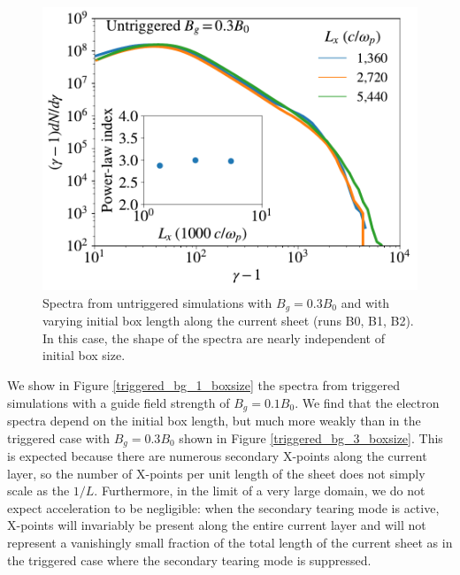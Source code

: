 \begin{figure}[htp] 
	\includegraphics[width=\linewidth]{untriggered_bguide_3_boxsize.pdf}
	\caption{Spectra from untriggered simulations with $B_{g}=0.3B_{0}$ and with varying initial box length along the current sheet (runs B0, B1, B2).  In this case, the shape of the spectra are nearly independent of initial box size.}
	\label{untriggered_bg_3_boxsize}
\end{figure}


We show in Figure \ref{triggered_bg_1_boxsize} the spectra from triggered simulations with a guide field strength of $B_{g}=0.1B_{0}$.  We find that the electron spectra depend on the initial box length, but much more weakly than in the triggered case with $B_{g}=0.3B_{0}$ shown in Figure \ref{triggered_bg_3_boxsize}.  This is expected because there are numerous secondary X-points along the current layer, so the number of X-points per unit length of the sheet does not simply scale as the $1/L$.  Furthermore, in the limit of a very large domain, we do not expect acceleration to be negligible: when the secondary tearing mode is active, X-points will invariably be present along the entire current layer and will not represent a vanishingly small fraction of the total length of the current sheet as in the triggered case where the secondary tearing mode is suppressed.

